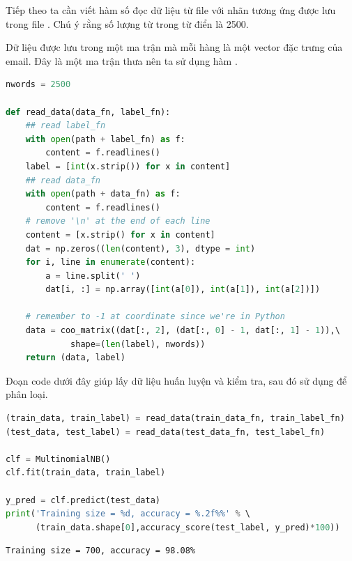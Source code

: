 Tiếp theo ta cần viết hàm số đọc dữ liệu từ file  với nhãn tương ứng được lưu trong file . Chú ý rằng số lượng từ trong từ điển là 2500. 
 
Dữ liệu được lưu trong một ma trận mà mỗi hàng là một vector đặc trưng của 
email. Đây là một ma trận thưa nên ta sử dụng hàm 
\href{https://docs.scipy.org/doc/scipy/reference/generated/scipy.sparse.coo_matrix.html}{}. 
 
\begin{lstlisting}[language=Python]
nwords = 2500  
 
def read_data(data_fn, label_fn): 
    ## read label_fn 
    with open(path + label_fn) as f: 
        content = f.readlines() 
    label = [int(x.strip()) for x in content] 
    ## read data_fn 
    with open(path + data_fn) as f: 
        content = f.readlines() 
    # remove '\n' at the end of each line 
    content = [x.strip() for x in content]  
    dat = np.zeros((len(content), 3), dtype = int) 
    for i, line in enumerate(content):  
        a = line.split(' ') 
        dat[i, :] = np.array([int(a[0]), int(a[1]), int(a[2])]) 
     
    # remember to -1 at coordinate since we're in Python 
    data = coo_matrix((dat[:, 2], (dat[:, 0] - 1, dat[:, 1] - 1)),\ 
             shape=(len(label), nwords)) 
    return (data, label) 
\end{lstlisting}
 
 
Đoạn code dưới đây giúp lấy dữ liệu huấn luyện và kiểm tra, sau đó sử dụng  để phân loại.
\begin{lstlisting}[language=Python]
(train_data, train_label) = read_data(train_data_fn, train_label_fn) 
(test_data, test_label) = read_data(test_data_fn, test_label_fn) 
 
clf = MultinomialNB() 
clf.fit(train_data, train_label) 
 
y_pred = clf.predict(test_data) 
print('Training size = %d, accuracy = %.2f%%' % \ 
      (train_data.shape[0],accuracy_score(test_label, y_pred)*100)) 
\end{lstlisting}
\kq
\begin{lstlisting}
Training size = 700, accuracy = 98.08% 
\end{lstlisting}
 
